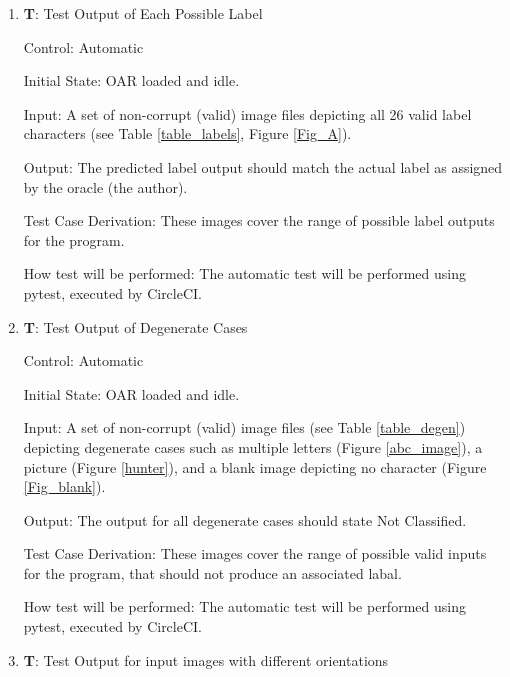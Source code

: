 \documentclass[12pt, titlepage]{article}
\newcounter{testnum} %
\begin{document}
\begin{enumerate}

  \item{\textbf{T\thetestnum \label{T_outputLabel}}: Test Output of Each Possible Label\\}
            
  Control: Automatic
            
  Initial State: OAR loaded and idle.
            
  Input: A set of non-corrupt (valid) image files depicting all 26 valid label characters (see Table \ref{table_labels}, Figure \ref{Fig_A}).
            
  Output: The predicted label output should match the actual label as assigned by the oracle (the author).

  Test Case Derivation: These images cover the range of possible label outputs for the program.
            
  How test will be performed: The automatic test will be performed using pytest, executed by CircleCI.

  \item{\textbf{T\thetestnum \label{T_outputDegen}}: Test Output of Degenerate Cases\\}
            
  Control: Automatic
            
  Initial State: OAR loaded and idle.
            
  Input: A set of non-corrupt (valid) image files (see Table \ref{table_degen}) depicting degenerate cases such as multiple letters (Figure \ref{abc_image}), a picture (Figure \ref{hunter}), and a blank image depicting no character (Figure \ref{Fig_blank}).
            
  Output: The output for all degenerate cases should state Not Classified.
            
  Test Case Derivation: These images cover the range of possible valid inputs for the program, that should not produce an associated labal.
            
  How test will be performed: The automatic test will be performed using pytest, executed by CircleCI.

  \item{\textbf{T\thetestnum \label{T_inputAngle}}: Test Output for input images with different orientations\\}
              

\end{enumerate}
\end{document}
